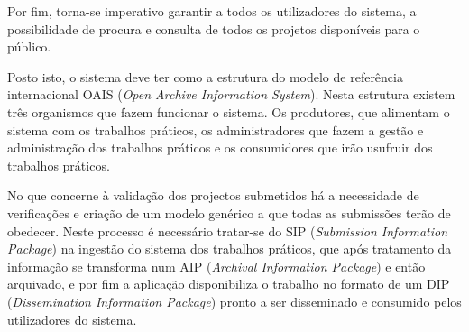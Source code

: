  Por fim, torna-se imperativo garantir a todos os utilizadores do sistema, a possibilidade de procura
 e consulta de todos os projetos disponíveis para o público.
 
 Posto isto, o sistema deve ter como a estrutura do modelo de referência internacional OAIS 
 (\textit{Open Archive Information System}).
 Nesta estrutura existem três organismos que fazem funcionar o sistema. Os produtores, que 
 alimentam o sistema com os trabalhos práticos, os administradores que fazem a gestão e administração
 dos trabalhos práticos e os consumidores que irão usufruir dos trabalhos práticos. 
 
No que concerne à validação dos projectos submetidos há a necessidade de verificações e 
criação de um modelo genérico a que todas as submissões terão de obedecer. Neste processo
é necessário tratar-se do SIP (\textit{Submission Information Package}) na ingestão do sistema dos
trabalhos práticos, que após tratamento da informação se transforma num AIP (\textit{Archival 
Information Package}) e então arquivado, e por fim a aplicação disponibiliza o trabalho no formato
de um DIP (\textit{Dissemination Information Package}) pronto a ser disseminado e consumido pelos
utilizadores do sistema.

\newpage
